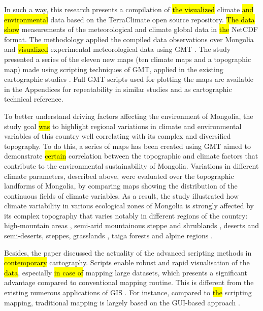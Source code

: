 \documentclass[geosciences,article,submit,pdftex,moreauthors]{Definitions/mdpi}
\begin{document}
In such a way, this research presents a compilation of \hl{the visualized} climate \hl{and environmental} data based on the TerraClimate open source repository. \hl{The data show} measurements of the meteorological and climate global data in \hl{the} NetCDF format. The methodology applied the compiled data observations over Mongolia and \hl{visualized} experimental meteorological data using GMT \cite{Wesseletal2019}. The study presented a series of the eleven new maps (ten climate maps and a topographic map) made using scripting techniques of GMT, applied in the existing cartographic studies \cite{Lemenkova2019a,Kasalica,Lemenkova2021d,Spinellis,Lemenkova2021e,Virden}. Full GMT scripts used for plotting the maps are available in the Appendices for repeatability in similar studies and as cartographic technical reference.  

To better understand driving factors affecting the environment of Mongolia, the study goal \hl{was} to highlight regional variations in climate and environmental variables of this country well correlating with its complex and diversified topography. To do this, a series of maps has been created using GMT aimed to demonstrate \hl{certain} correlation between the topographic and climate factors that contribute to the environmental sustainability of Mongolia. Variations in different climate parameters, described above, were evaluated over the topographic landforms of Mongolia, by comparing maps showing the distribution of the continuous fields of climate variables. As a result, the study illustrated how climate variability in various ecological zones of Mongolia is strongly affected by its complex topography that varies notably in different regions of the country: high-mountain areas \cite{UNKELBACH2021100073,UNKELBACH2021107076}, semi-arid mountainous steppe and shrublands \cite{Minderlein}, deserts and semi-deserts, steppes, grasslands \cite{WANG2022108783,LIU2021108567}, taiga forests \cite{GRADEL201724,DULAMSUREN2005376} and alpine regions \cite{KLINGE2022108113}. 

Besides, the paper discussed the actuality of the advanced scripting methods in \hl{contemporary} cartography. Scripts enable robust and rapid visualisation of the \hl{data}, especially \hl{in case of} mapping large datasets, which presents a significant advantage compared to conventional mapping routine. This is different from the existing numerous applications of GIS \cite{FAN201696,TSUTSUMIDA2015196,Lemenkova2020c,Amarsaikhan,NAKAYAMA2021109404,Lemenkova2020d,PARK2019103630,OSULLIVAN2019101979}. For instance, compared to \hl{the} scripting mapping, traditional mapping is largely based on the GUI-based approach \cite{Tuvshin,Lemenkova2020e,Lemenkova2021f,HOLGUIN2018137}. 
\end{document}
